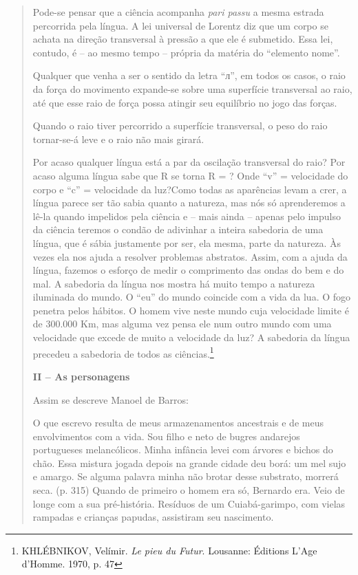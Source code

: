\begin{quote}
Pode-se pensar que a ciência acompanha \emph{pari passu} a mesma estrada
percorrida pela língua. A lei universal de Lorentz diz que um corpo se
achata na direção transversal à pressão a que ele é submetido. Essa lei,
contudo, é -- ao mesmo tempo -- própria da matéria do ``elemento nome''.

Qualquer que venha a ser o sentido da letra ``л'', em todos os casos, o
raio da força do movimento expande-se sobre uma superfície transversal
ao raio, até que esse raio de força possa atingir seu equilíbrio no jogo
das forças.

Quando o raio tiver percorrido a superfície transversal, o peso do raio
tornar-se-á leve e o raio não mais girará.

Por acaso qualquer língua está a par da oscilação transversal do raio?
Por acaso alguma língua sabe que R se torna R = ? Onde ``v'' =
velocidade do corpo e ``c'' = velocidade da luz?Como todas as aparências
levam a crer, a língua parece ser tão sabia quanto a natureza, mas nós
só aprenderemos a lê-la quando impelidos pela ciência e -- mais ainda --
apenas pelo impulso da ciência teremos o condão de adivinhar a inteira
sabedoria de uma língua, que é sábia justamente por ser, ela mesma,
parte da natureza. Às vezes ela nos ajuda a resolver problemas
abstratos. Assim, com a ajuda da língua, fazemos o esforço de medir o
comprimento das ondas do bem e do mal. A sabedoria da língua nos mostra
há muito tempo a natureza iluminada do mundo. O ``eu'' do mundo coincide
com a vida da lua. O fogo penetra pelos hábitos. O homem vive neste
mundo cuja velocidade limite é de 300.000 Km, mas alguma vez pensa ele
num outro mundo com uma velocidade que excede de muito a velocidade da
luz? A sabedoria da língua precedeu a sabedoria de todos as
ciências.\footnote{KHLÉBNIKOV, Velímir. \emph{Le pieu du Futur}.
  Lousanne: Éditions L'Age d'Homme. 1970, p. 47}

\textbf{II -- As personagens}

Assim se descreve Manoel de Barros:

O que escrevo resulta de meus armazenamentos ancestrais e de meus
envolvimentos com a vida. Sou filho e neto de bugres andarejos
portugueses melancólicos. Minha infância levei com árvores e bichos do
chão. Essa mistura jogada depois na grande cidade deu borá: um mel sujo
e amargo. Se alguma palavra minha não brotar desse substrato, morrerá
seca. (p. 315) Quando de primeiro o homem era só, Bernardo era. Veio de
longe com a sua pré-história. Resíduos de um Cuiabá-garimpo, com vielas
rampadas e crianças papudas, assistiram seu nascimento.


\end{quote}
